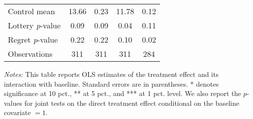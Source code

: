 \begin{table}[htbp]
{\begin{threeparttable}
\begin{tabular}{l*{4}{c}}
Control mean    &    13.66         &     0.23         &    11.78         &     0.12         \\
Lottery \emph{p}-value&     0.09         &     0.09         &     0.04         &     0.11         \\
Regret \emph{p}-value&     0.22         &     0.22         &     0.10         &     0.02         \\
Observations    &      311         &      311         &      311         &      284         \\
\bottomrule \end{tabular} \begin{tablenotes}[flushleft] \footnotesize \item \emph{Notes:} This table reports OLS estimates of the treatment effect and its interaction with baseline. Standard errors are in parentheses. * denotes significance at 10 pct., ** at 5 pct., and *** at 1 pct. level. We also report the \(p\)-values for joint tests on the direct treatment effect conditional on the baseline covariate $= 1$. \end{tablenotes} \end{threeparttable} } \end{table}


